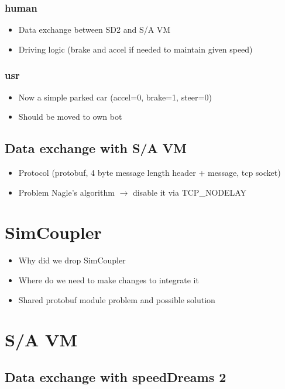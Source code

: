\documentclass[paper=a4, fontsize=11pt]{scrartcl}
\begin{document}
\subsubsection{human}
\begin{itemize}
  \item Data exchange between SD2 and S/A VM
  \item Driving logic (brake and accel if needed to maintain given speed)
\end{itemize}
\subsubsection{usr}
\begin{itemize}
  \item Now a simple parked car (accel=0, brake=1, steer=0)
  \item Should be moved to own bot
\end{itemize}
\subsection{Data exchange with S/A VM}
\begin{itemize}
  \item Protocol (protobuf, 4 byte message length header + message, tcp socket)
  \item Problem Nagle's algorithm $\rightarrow$ disable it via TCP\_NODELAY
\end{itemize}
\section{SimCoupler}
\begin{itemize}
  \item Why did we drop SimCoupler
  \item Where do we need to make changes to integrate it
  \item Shared protobuf module problem and possible solution
\end{itemize}
\newpage
\section{S/A VM}
\subsection{Data exchange with speedDreams 2}
\end{document}
